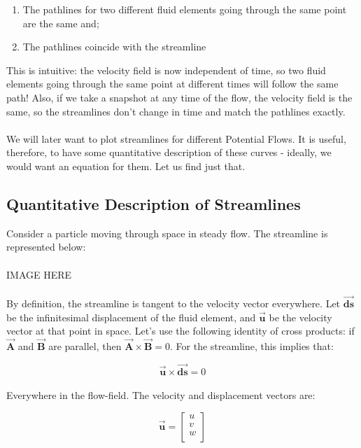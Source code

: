 \documentclass[11pt]{article}
\begin{document}
\begin{enumerate}
    \item The pathlines for two different fluid elements going through the same point are the same and;
    \item The pathlines coincide with the streamline
\end{enumerate}
This is intuitive: the velocity field is now independent of time, so two fluid elements going through the same point at different times will follow the same path! Also, if we take a snapshot at any time of the flow, the velocity field is the same, so the streamlines don't change in time and match the pathlines exactly. \\ \\
\noindent
We will later want to plot streamlines for different Potential Flows. It is useful, therefore, to have some quantitative description of these curves - ideally, we would want an equation for them. Let us find just that.

\subsection{Quantitative Description of Streamlines}
Consider a particle moving through space in steady flow. The streamline is represented below: \\ \\

IMAGE HERE \\ \\
\noindent
By definition, the streamline is tangent to the velocity vector everywhere. Let $\vec{\bm{ds}}$ be the infinitesimal displacement of the fluid element, and $\vec{\bm{u}}$ be the velocity vector at that point in space. Let's use the following identity of cross products: if $\vec{\bm{A}}$ and $\vec{\bm{B}}$ are parallel, then $\vec{\bm{A}} \times \vec{\bm{B}} = 0$. For the streamline, this implies that:

\begin{equation*}
    \vec{\bm{u}} \times \vec{\bm{ds}} = 0
\end{equation*}\\
\noindent
Everywhere in the flow-field. The velocity and displacement vectors are:

\begin{equation*}
    \vec{\bm{u}} =  \begin{bmatrix}
        u \\
        v \\
        w \\     
        \end{bmatrix}
\end{equation*}
\end{document}
